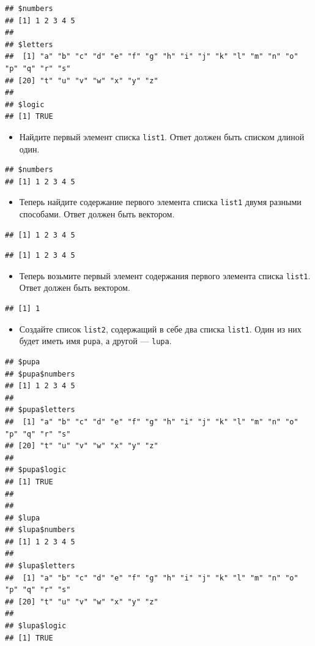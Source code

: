 \documentclass[]{book}
\providecommand{\tightlist}{%
  \setlength{\itemsep}{0pt}\setlength{\parskip}{0pt}}
\begin{document}
\begin{verbatim}
## $numbers
## [1] 1 2 3 4 5
## 
## $letters
##  [1] "a" "b" "c" "d" "e" "f" "g" "h" "i" "j" "k" "l" "m" "n" "o" "p" "q" "r" "s"
## [20] "t" "u" "v" "w" "x" "y" "z"
## 
## $logic
## [1] TRUE
\end{verbatim}

\begin{itemize}
\tightlist
\item
  Найдите первый элемент списка \texttt{list1}. Ответ должен быть
  списком длиной один.
\end{itemize}

\begin{verbatim}
## $numbers
## [1] 1 2 3 4 5
\end{verbatim}

\begin{itemize}
\tightlist
\item
  Теперь найдите содержание первого элемента списка \texttt{list1} двумя
  разными способами. Ответ должен быть вектором.
\end{itemize}

\begin{verbatim}
## [1] 1 2 3 4 5
\end{verbatim}

\begin{verbatim}
## [1] 1 2 3 4 5
\end{verbatim}

\begin{itemize}
\tightlist
\item
  Теперь возьмите первый элемент содержания первого элемента списка
  \texttt{list1}. Ответ должен быть вектором.
\end{itemize}

\begin{verbatim}
## [1] 1
\end{verbatim}

\begin{itemize}
\tightlist
\item
  Создайте список \texttt{list2}, содержащий в себе два списка
  \texttt{list1}. Один из них будет иметь имя \texttt{pupa}, а другой
  --- \texttt{lupa}.
\end{itemize}

\begin{verbatim}
## $pupa
## $pupa$numbers
## [1] 1 2 3 4 5
## 
## $pupa$letters
##  [1] "a" "b" "c" "d" "e" "f" "g" "h" "i" "j" "k" "l" "m" "n" "o" "p" "q" "r" "s"
## [20] "t" "u" "v" "w" "x" "y" "z"
## 
## $pupa$logic
## [1] TRUE
## 
## 
## $lupa
## $lupa$numbers
## [1] 1 2 3 4 5
## 
## $lupa$letters
##  [1] "a" "b" "c" "d" "e" "f" "g" "h" "i" "j" "k" "l" "m" "n" "o" "p" "q" "r" "s"
## [20] "t" "u" "v" "w" "x" "y" "z"
## 
## $lupa$logic
## [1] TRUE
\end{verbatim}
\end{document}
